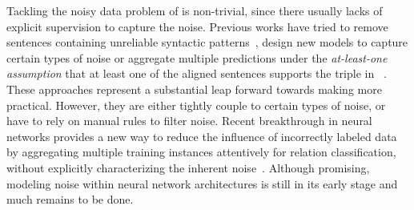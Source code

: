 Tackling the noisy data problem of \DS is non-trivial, since there usually lacks of explicit supervision to capture the noise.
Previous works have tried to remove sentences containing unreliable syntactic patterns~\cite{takamatsu2012reducing},
design new models to capture certain types of noise or aggregate multiple predictions under the
\textit{at-least-one assumption}
that at least one of the aligned sentences supports the triple in \KB~\cite{riedel2010modeling,surdeanu2012multi,ritter2013modeling,min2013distant}.
These approaches represent a substantial leap forward towards making \DS more practical. However,  they are either tightly couple to certain types of noise,
or have to rely on manual rules to filter noise. %
%
Recent breakthrough in neural networks provides a new way to reduce the influence of incorrectly labeled data by aggregating multiple training instances attentively for relation classification, without explicitly characterizing the inherent noise~\cite{lin2016neural,zeng2015distant}.
Although promising, %
 modeling noise within neural network architectures is still in its early stage and much remains to be done.


